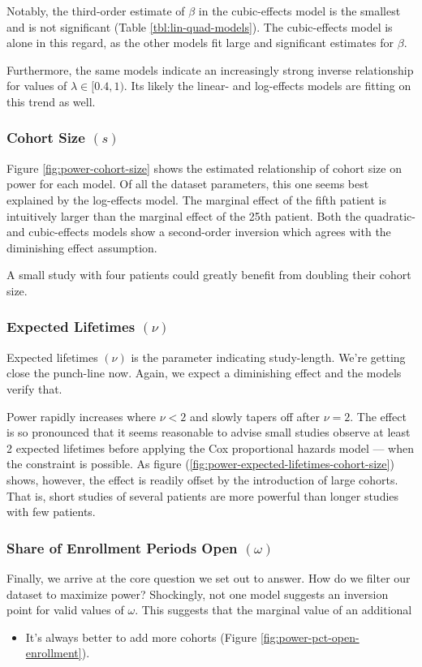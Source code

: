Notably, the third-order estimate of $\beta$ in the cubic-effects model is the smallest and is not significant (Table \ref{tbl:lin-quad-models}). The cubic-effects model is alone in this regard, as the other models fit large and significant estimates for $\beta$.

Furthermore, the same models indicate an increasingly strong inverse relationship for values of $\lambda \in [0.4, 1)$. Its likely the linear- and log-effects models are fitting on this trend as well. 

\subsubsection{Cohort Size $(s)$}

Figure \ref{fig:power-cohort-size} shows the estimated relationship of cohort size on power for each model. Of all the dataset parameters, this one seems best explained by the log-effects model. The marginal effect of the fifth patient is intuitively larger than the marginal effect of the 25th patient. Both the quadratic- and cubic-effects models show a second-order inversion which agrees with the diminishing effect assumption. 

A small study with four patients could greatly benefit from doubling their cohort size. 

\subsubsection{Expected Lifetimes $(\nu)$}

Expected lifetimes $(\nu)$ is the parameter indicating study-length. We're getting close the punch-line now. Again, we expect a diminishing effect and the models verify that. 

Power rapidly increases where $\nu < 2$ and slowly tapers off after $\nu = 2$. The effect is so pronounced that it seems reasonable to advise small studies observe at least 2 expected lifetimes before applying the Cox proportional hazards model --- when the constraint is possible. As figure (\ref{fig:power-expected-lifetimes-cohort-size}) shows, however, the effect is readily offset by the introduction of large cohorts. That is, short studies of several patients are more powerful than longer studies with few patients. 

\subsubsection{Share of Enrollment Periods Open $(\omega)$}

Finally, we arrive at the core question we set out to answer. How do we filter our dataset to maximize power?  Shockingly, not one model suggests an inversion point for valid values of $\omega$. This suggests that the marginal value of an additional 


\begin{itemize}
    \item It's always better to add more cohorts (Figure \ref{fig:power-pct-open-enrollment}).
\end{itemize}

